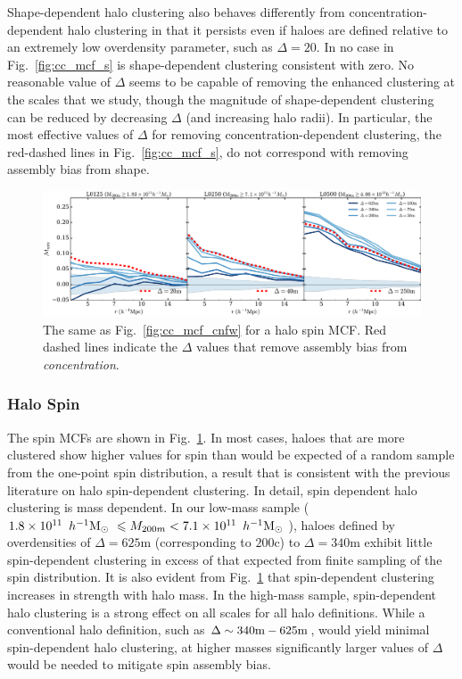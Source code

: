 \documentclass[usenatbib,fleqn]{mnras}
\begin{document}
Shape-dependent halo clustering also behaves differently from concentration-dependent halo clustering in that it persists even if haloes are defined relative to an extremely low overdensity parameter, such as $\Delta=20$. In no case in Fig.~\ref{fig:cc_mcf_s} is shape-dependent clustering consistent with zero. No reasonable value of $\Delta$ seems to be capable of removing the enhanced clustering at the scales that we study, though the magnitude of shape-dependent clustering can be reduced by decreasing $\Delta$ (and increasing halo radii). In particular, the most effective values of $\Delta$ for removing concentration-dependent clustering, the red-dashed lines in Fig.~\ref{fig:cc_mcf_s}, do not correspond with removing assembly bias from shape. 

\begin{figure}
	\centering
	\includegraphics[width=\textwidth]{all_mcf_spin.pdf}
	\caption{
The same as Fig.~\ref{fig:cc_mcf_cnfw} for a halo spin MCF.
Red dashed lines indicate the $\Delta$ values that remove assembly bias from \emph{concentration}. 
}
	\label{fig:cc_mcf_spin}
\end{figure}

\subsubsection{Halo Spin}

The spin MCFs are shown in Fig.~\ref{fig:cc_mcf_spin}. In most cases, haloes that are more clustered show higher values for spin than would be expected of a random sample from the one-point spin distribution, a result that is consistent with the previous literature on halo spin-dependent clustering.
In detail, spin dependent halo clustering is mass dependent. In our low-mass sample ($1.8 \times 10^{11}\, \ h^{-1}\mathrm{M}_{\odot}~ \leqslant M_{200m} < 7.1 \times 10^{11}\, \ h^{-1}\mathrm{M}_{\odot}~$), haloes defined by overdensities of $\Delta=625$m (corresponding to $200$c) to $\Delta=340$m exhibit little spin-dependent clustering in excess of that expected from finite sampling of the spin distribution. It is also evident from Fig.~\ref{fig:cc_mcf_spin} that spin-dependent clustering increases in strength with halo mass. In the high-mass sample, spin-dependent halo clustering is a strong effect on all scales for all halo definitions. While a conventional halo definition, such as $\Delta \sim 340{\rm m}-625{\rm m}$, would yield minimal spin-dependent halo clustering, at higher masses significantly larger values of $\Delta$ would be needed to mitigate spin assembly bias.
\end{document}
